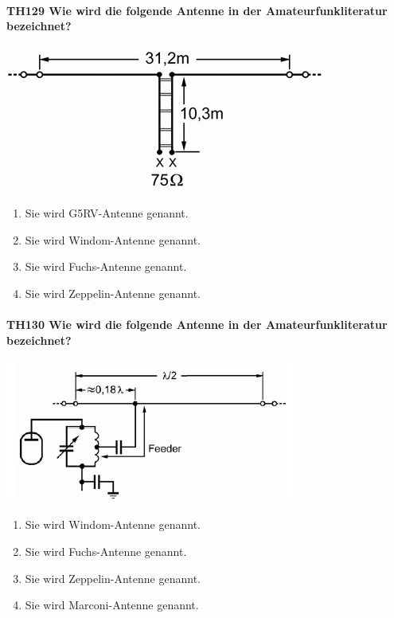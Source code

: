 \documentclass[8pt]{article}
\begin{document}
\paragraph*{TH129 Wie wird die folgende Antenne in der Amateurfunkliteratur bezeichnet?}
\begin{center}
	\begin{minipage}{\linewidth}
		\centering
		\includegraphics[scale=1.0]{pics/th129_a.jpg}
	\end{minipage}
\end{center}
\begin{enumerate}[nolistsep,label=\Alph*]
\item Sie wird G5RV-Antenne genannt.
\item Sie wird Windom-Antenne genannt.
\item Sie wird Fuchs-Antenne genannt.
\item Sie wird Zeppelin-Antenne genannt.
\end{enumerate}

\paragraph*{TH130 Wie wird die folgende Antenne in der Amateurfunkliteratur bezeichnet?}
\begin{center}
	\begin{minipage}{\linewidth}
		\centering
		\includegraphics[scale=1.0]{pics/th130_a.jpg}
	\end{minipage}
\end{center}
\begin{enumerate}[nolistsep,label=\Alph*]
\item Sie wird Windom-Antenne genannt.
\item Sie wird Fuchs-Antenne genannt.
\item Sie wird Zeppelin-Antenne genannt.
\item Sie wird Marconi-Antenne genannt.
\end{enumerate}
\end{document}
